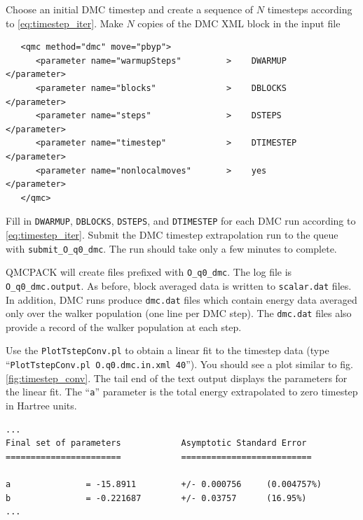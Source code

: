 Choose an initial DMC timestep and create a sequence of $N$ timesteps according to \ref{eq:timestep_iter}.  Make $N$ copies of the DMC XML block in the input file
\begin{lstlisting}
   <qmc method="dmc" move="pbyp">
      <parameter name="warmupSteps"         >    DWARMUP         </parameter>
      <parameter name="blocks"              >    DBLOCKS         </parameter>
      <parameter name="steps"               >    DSTEPS          </parameter>
      <parameter name="timestep"            >    DTIMESTEP       </parameter>
      <parameter name="nonlocalmoves"       >    yes             </parameter>
   </qmc>
\end{lstlisting}
\noindent
Fill in \texttt{DWARMUP}, \texttt{DBLOCKS}, \texttt{DSTEPS}, and \texttt{DTIMESTEP} for each DMC run according to \ref{eq:timestep_iter}.  Submit the DMC timestep extrapolation run to the queue with \texttt{submit\_O\_q0\_dmc}.  The run should take only a few minutes to complete.

QMCPACK will create files prefixed with \texttt{O\_q0\_dmc}.  The log file is \texttt{O\_q0\_dmc.output}.  As before, block averaged data is written to \texttt{scalar.dat} files.  In addition, DMC runs produce \texttt{dmc.dat} files which contain energy data averaged only over the walker population (one line per DMC step).  The \texttt{dmc.dat} files also provide a record of the walker population at each step.

Use the \texttt{PlotTstepConv.pl} to obtain a linear fit to the timestep data (type ``\texttt{PlotTstepConv.pl O.q0.dmc.in.xml 40}'').  You should see a plot similar to fig. \ref{fig:timestep_conv}.  The tail end of the text output displays the parameters for the linear fit.  The ``\texttt{a}'' parameter is the total energy extrapolated to zero timestep in Hartree units. 

\begin{shaded}
\begin{verbatim}
...
Final set of parameters            Asymptotic Standard Error
=======================            ==========================

a               = -15.8911         +/- 0.000756     (0.004757%)
b               = -0.221687        +/- 0.03757      (16.95%)
...
\end{verbatim}
\end{shaded}

